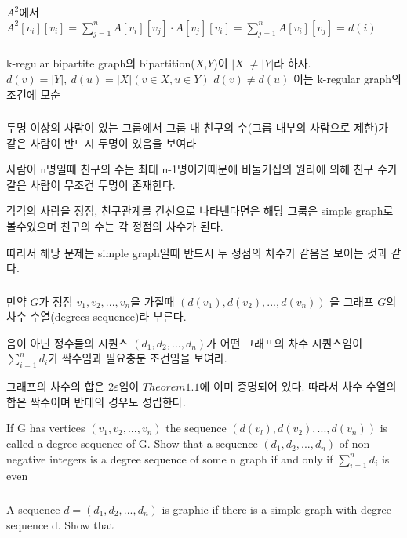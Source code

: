 \documentclass{oblivoir}
\begin{document}
$A^2$에서 $A^2[v_i][v_i] = \sum_{j=1}^n A[v_i][v_j] \cdot A[v_j][v_i]= \sum_{j=1}^n A[v_i][v_j] = d(i)$

\subsubsection{} 

k-regular bipartite graph의 bipartition($X$,$Y$)이 $|X|\neq |Y|$라 하자. $d(v)=|Y|,\: d(u)=|X|(v \in X, u \in Y )$ $d(v) \neq d(u)$ 이는 k-regular graph의 조건에 모순

\subsubsection{} 

두명 이상의 사람이 있는 그룹에서 그룹 내 친구의 수(그룹 내부의 사람으로 제한)가 같은 사람이 반드시 두명이 있음을 보여라

사람이 n명일때 친구의 수는 최대 n-1명이기때문에 비둘기집의 원리에 의해 친구 수가 같은 사람이 무조건 두명이 존재한다.

각각의 사람을 정점, 친구관계를 간선으로 나타낸다면은 해당 그룹은 simple graph로 볼수있으며 친구의 수는 각 정점의 차수가 된다.

따라서 해당 문제는 simple graph일때 반드시 두 정점의 차수가 같음을 보이는 것과 같다. 
\subsubsection{} 
만약 $G$가 정점 $v_1, v_2, ... , v_n$을 가질때 $(d(v_1), d(v_2), ... , d(v_n))$ 을 그래프 $G$의 차수 수열(degrees sequence)라 부른다.

음이 아닌 정수들의 시퀀스 $(d_1, d_2, ... , d_n)$가 어떤 그래프의 차수 시퀀스임이 $\sum_{i=1}^n d_i$가 짝수임과 필요충분 조건임을 보여라.

그래프의 차수의 합은 $2\varepsilon$임이  $Theorem1.1$에 이미 증명되어 있다. 따라서 차수 수열의 합은 짝수이며 반대의 경우도 성립한다.


If G has vertices $(v_1, v_2, ... , v_n)$ the sequence $(d(v_l), d(v_2), ... , d(v_n))$ is called a degree sequence of G. 
Show that a sequence $(d_1, d_2, ... , d_n)$ of non-negative integers is a degree sequence of some n
graph if and only if $\sum_{i=1}^n d_i$ is even

\subsubsection{} 
    A sequence $d = (d_1, d_2 , ... , d_n)$ is graphic if there is a simple graph with degree sequence d. Show that
\end{document}
